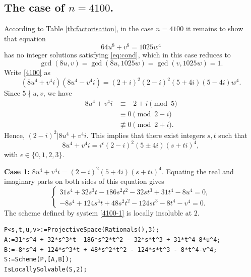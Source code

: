 \documentclass[a4paper,12pt,english,reqno]{amsart}
\begin{document}
\subsection{The case of $n=4100$.} %
According to Table \ref{tb:factorisation}, in the case $n=4100$ it remains to
show that equation
\begin{equation}\label{4100}
64 u^8 + v^8=1025  w^4
\end{equation}
has no integer solutions satisfying \eqref{eq:cond}, which in this case reduces to \[\gcd(8u,v)=\gcd(8u,1025w)=\gcd(v,1025w)=1.\]
Write \eqref{4100} as
\begin{equation} (8u^4+v^4i)(8u^4-v^4i)=(2+i)^2(2-i)^2(5+4i)(5-4i)w^4.
\end{equation}
Since $5\nmid u,v$, we have 
\[\begin{split}8u^4+v^4i&\equiv -2+i\pmod{5}\\
&\equiv 0\pmod{2-i}\\
&\not\equiv 0\pmod{2+i}.\end{split}\]
Hence, $(2-i)^2|8u^4+v^4i$. This implies that there exist integers $s,t$ such that 
\[8u^4+v^4i=i^{\epsilon}(2-i)^2(5\pm 4i)(s+ti)^4,\]
with $\epsilon \in \{0,1,2,3\}$.




{\bf Case 1:} $8u^4+v^4i=(2-i)^2(5+4i)(s+ti)^4$. Equating the real and imaginary parts on both sides of this equation gives
\begin{equation}\label{4100-1}
\begin{cases}
31s^4 + 32s^3t -186s^2t^2 - 32st^3 + 31t^4-8u^4=0,\\
-8s^4 + 124s^3t + 48s^2t^2 - 124st^3 - 8t^4-v^4=0.
\end{cases}
\end{equation}
The scheme defined by system \eqref{4100-1} is locally insoluble at $2$.




\begin{lstlisting}
P<s,t,u,v>:=ProjectiveSpace(Rationals(),3);
A:=31*s^4 + 32*s^3*t -186*s^2*t^2 - 32*s*t^3 + 31*t^4-8*u^4;
B:=-8*s^4 + 124*s^3*t + 48*s^2*t^2 - 124*s*t^3 - 8*t^4-v^4;
S:=Scheme(P,[A,B]);
IsLocallySolvable(S,2);
\end{lstlisting}
\end{document}
